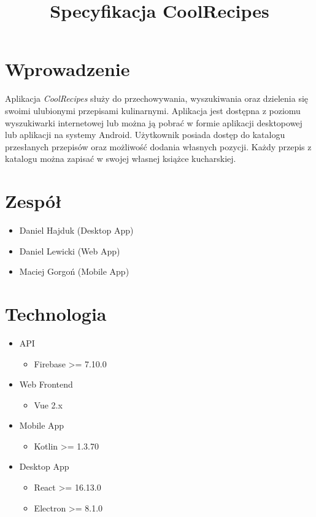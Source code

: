 \documentclass[11pt]{article}
\title{Specyfikacja CoolRecipes}
\author{}
\begin{document}
  \maketitle

  \section{Wprowadzenie}
  Aplikacja \textit{CoolRecipes} służy do przechowywania, wyszukiwania oraz dzielenia się swoimi ulubionymi przepisami kulinarnymi. Aplikacja jest dostępna z poziomu wyszukiwarki internetowej lub można ją pobrać w formie aplikacji desktopowej lub aplikacji na systemy Android. Użytkownik posiada dostęp do katalogu przesłanych przepisów oraz możliwość dodania własnych pozycji. Każdy przepis z katalogu można zapisać w swojej własnej książce kucharskiej.

  \section{Zespół}
  \begin{itemize}
    \item Daniel Hajduk (Desktop App)  
    \item Daniel Lewicki (Web App)
    \item Maciej Gorgoń (Mobile App)
  \end{itemize}

  \section{Technologia}
  
  \begin{itemize}
    \item API
    \begin{itemize}
    \item Firebase >= 7.10.0
    \end{itemize}
    
    \item Web Frontend
    \begin{itemize}
      \item Vue 2.x
    \end{itemize}
    
    \item Mobile App
    \begin{itemize}
      \item Kotlin >= 1.3.70
    \end{itemize}
    
    \item Desktop App
    \begin{itemize}
      \item React >= 16.13.0
      \item Electron >= 8.1.0
    \end{itemize}
    
    
  \end{itemize}
\end{document}
